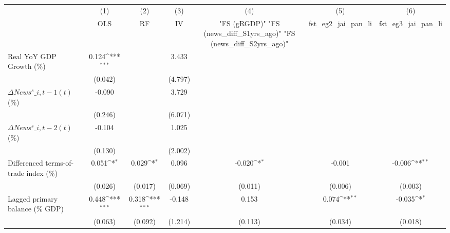 {
\def\sym#1{\ifmmode^{#1}\else\(^{#1}\)\fi}
\begin{tabular}{l*{6}{c}}
\toprule
                    &\multicolumn{1}{c}{(1)}&\multicolumn{1}{c}{(2)}&\multicolumn{1}{c}{(3)}&\multicolumn{1}{c}{(4)}&\multicolumn{1}{c}{(5)}&\multicolumn{1}{c}{(6)}\\
                    &\multicolumn{1}{c}{OLS}&\multicolumn{1}{c}{RF}&\multicolumn{1}{c}{IV}&\multicolumn{1}{c}{ "FS (gRGDP)"  "FS (news\_diff\_S1yrs\_ago)"  "FS (news\_diff\_S2yrs\_ago)" }&\multicolumn{1}{c}{fst\_eg2\_jai\_pan\_li}&\multicolumn{1}{c}{fst\_eg3\_jai\_pan\_li}\\
\midrule
Real YoY GDP Growth (\%)&       0.124\sym{***}&                     &       3.433         &                     &                     &                     \\
                    &     (0.042)         &                     &     (4.797)         &                     &                     &                     \\
\addlinespace
$ \Delta News^s\_{i,t-1}(t)$ (\%)&      -0.090         &                     &       3.729         &                     &                     &                     \\
                    &     (0.246)         &                     &     (6.071)         &                     &                     &                     \\
\addlinespace
$ \Delta News^s\_{i,t-2}(t)$ (\%)&      -0.104         &                     &       1.025         &                     &                     &                     \\
                    &     (0.130)         &                     &     (2.002)         &                     &                     &                     \\
\addlinespace
Differenced terms-of-trade index (\%)&       0.051\sym{*}  &       0.029\sym{*}  &       0.096         &      -0.020\sym{*}  &      -0.001         &      -0.006\sym{**} \\
                    &     (0.026)         &     (0.017)         &     (0.069)         &     (0.011)         &     (0.006)         &     (0.003)         \\
\addlinespace
Lagged primary balance (\% GDP)&       0.448\sym{***}&       0.318\sym{***}&      -0.148         &       0.153         &       0.074\sym{**} &      -0.035\sym{*}  \\
                    &     (0.063)         &     (0.092)         &     (1.214)         &     (0.113)         &     (0.034)         &     (0.018)         \\

\end{tabular}}
